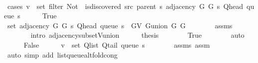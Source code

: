 \begin{isabellebody}
\ \ \isamarkupfalse%
\ {\isacharparenleft}{\kern0pt}cases\ {\isachardoublequoteopen}v\ {\isasymin}\ set\ {\isacharparenleft}{\kern0pt}filter\ {\isacharparenleft}{\kern0pt}Not\ {\isasymcirc}\ is{\isacharunderscore}{\kern0pt}discovered\ src\ {\isacharparenleft}{\kern0pt}parent\ s{\isacharparenright}{\kern0pt}{\isacharparenright}{\kern0pt}\ {\isacharparenleft}{\kern0pt}adjacency\ G{}\ G{}\ s\ {\isacharparenleft}{\kern0pt}Q{\isacharunderscore}{\kern0pt}head\ {\isacharparenleft}{\kern0pt}queue\ s{\isacharparenright}{\kern0pt}{\isacharparenright}{\kern0pt}{\isacharparenright}{\kern0pt}{\isacharparenright}{\kern0pt}{\isachardoublequoteclose}{\isacharparenright}{\kern0pt}\isanewline
\ \ \ \ \isamarkupfalse%
\ True\isanewline
\ \ \ \ \isamarkupfalse%
\ {\isachardoublequoteopen}set\ {\isacharparenleft}{\kern0pt}adjacency\ G{}\ G{}\ s\ {\isacharparenleft}{\kern0pt}Q{\isacharunderscore}{\kern0pt}head\ {\isacharparenleft}{\kern0pt}queue\ s{\isacharparenright}{\kern0pt}{\isacharparenright}{\kern0pt}{\isacharparenright}{\kern0pt}\ {\isasymsubseteq}\ G{\isachardot}{\kern0pt}V\ {\isacharparenleft}{\kern0pt}G{\isachardot}{\kern0pt}union\ G{}\ G{}{\isacharparenright}{\kern0pt}{\isachardoublequoteclose}\isanewline
\ \ \ \ \ \ \isamarkupfalse%
\ assms{\isacharparenleft}{\kern0pt}{}{\isacharcomma}{\kern0pt}\ {}{\isacharparenright}{\kern0pt}\isanewline
\ \ \ \ \ \ \isamarkupfalse%
\ {\isacharparenleft}{\kern0pt}intro\ adjacency{\isacharunderscore}{\kern0pt}subset{\isacharunderscore}{\kern0pt}V{\isacharunderscore}{\kern0pt}union{\isacharparenright}{\kern0pt}\isanewline
\ \ \ \ \isamarkupfalse%
\ {\isacharquery}{\kern0pt}thesis\isanewline
\ \ \ \ \ \ \isamarkupfalse%
\ True\isanewline
\ \ \ \ \ \ \isamarkupfalse%
\ auto\isanewline
\ \ \isamarkupfalse%
\isanewline
\ \ \ \ \isamarkupfalse%
\ False\isanewline
\ \ \ \ \isamarkupfalse%
\ {\isachardoublequoteopen}v\ {\isasymin}\ set\ {\isacharparenleft}{\kern0pt}Q{\isacharunderscore}{\kern0pt}list\ {\isacharparenleft}{\kern0pt}Q{\isacharunderscore}{\kern0pt}tail\ {\isacharparenleft}{\kern0pt}queue\ s{\isacharparenright}{\kern0pt}{\isacharparenright}{\kern0pt}{\isacharparenright}{\kern0pt}{\isachardoublequoteclose}\isanewline
\ \ \ \ \ \ \isamarkupfalse%
\ assms\ assm\isanewline
\ \ \ \ \ \ \isamarkupfalse%
\ {\isacharparenleft}{\kern0pt}auto\ simp\ add{\isacharcolon}{\kern0pt}\ list{\isacharunderscore}{\kern0pt}queue{\isacharunderscore}{\kern0pt}alt{\isacharunderscore}{\kern0pt}fold{\isacharunderscore}{\kern0pt}cong{\isacharparenright}{\kern0pt}\isanewline

\end{isabellebody}
